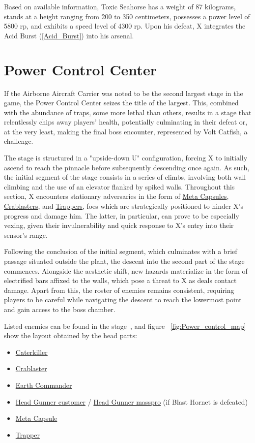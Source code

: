 Based on available information, Toxic Seahorse has a weight of 87 kilograms, stands at a height ranging from 200 to 350 centimeters, possesses a power level of 5800 rp, and exhibits a speed level of 4300 rp. Upon his defeat, X integrates the Acid Burst (\ref{Acid_Burst}) into his arsenal.




\section{Power Control Center}
If the Airborne Aircraft Carrier was noted to be the second largest stage in the game, the Power Control Center seizes the title of the largest. This, combined with the abundance of traps, some more lethal than others, results in a stage that relentlessly chips away players' health, potentially culminating in their defeat or, at the very least, making the final boss encounter, represented by Volt Catfish, a challenge.

The stage is structured in a "upside-down U" configuration, forcing X to initially ascend to reach the pinnacle before subsequently descending once again. As such, the initial segment of the stage consists in a series of climbs, involving both wall climbing and the use of an elevator flanked by spiked walls. Throughout this section, X encounters stationary adversaries in the form of \hyperlink{enem:Meta_Capsule}{Meta Capsules}, \hyperlink{enem:Crablaster}{Crablasters}, and \hyperlink{enem:Trapper}{Trappers}, foes which are strategically positioned to hinder X's progress and damage him. The latter, in particular, can prove to be especially vexing, given their invulnerability and quick response to X's entry into their sensor's range.

Following the conclusion of the initial segment, which culminates with a brief passage situated outside the plant, the descent into the second part of the stage commences. Alongside the aesthetic  shift, new hazards materialize in the form of electrified bars affixed to the walls, which pose a threat to X as deals contact damage. Apart from this, the roster of enemies remains consistent, requiring players to be careful while navigating the descent to reach the lowermost point and gain access to the boss chamber.

Listed enemies can be found in the stage~\cite{wiki:Power_control}, and figure ~\ref{fig:Power_control_map} show the layout obtained by the head parts:
\begin{itemize}
	\item \hyperlink{enem:Caterkiller}{Caterkiller}
	\item \hyperlink{enem:Crablaster}{Crablaster}
	\item \hyperlink{enem:Earth_Commander}{Earth Commander}
	\item \hyperlink{enem:Head_Gunner_customer}{Head Gunner customer} / \hyperlink{enem:Head_Gunner_masspro}{Head Gunner masspro} (if Blast Hornet is defeated) 
	\item \hyperlink{enem:Meta_Capsule}{Meta Capsule}
	\item \hyperlink{enem:Trapper}{Trapper}
\end{itemize}

